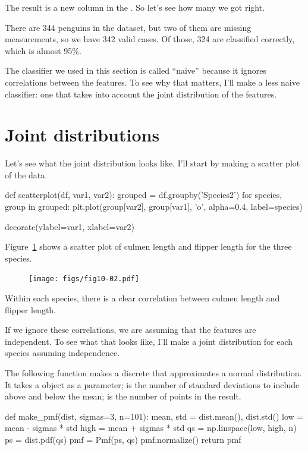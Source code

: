 \documentclass[12pt]{book}
\theoremstyle{exercise}
\begin{document}
The result is a new column in the .
So let's see how many we got right.

There are 344 penguins in the dataset, but two of them are missing
measurements, so we have 342 valid cases.
Of those, 324 are classified correctly, which is almost 95\%.

The classifier we used in this section is called ``naive'' because it
ignores correlations between the features. To see why that matters, I'll
make a less naive classifier: one that takes into account the joint
distribution of the features.

\section{Joint distributions}
\label{joint-distributions}

Let's see what the joint distribution looks like.
I'll start by making a scatter plot of the data.

\begin{code}
def scatterplot(df, var1, var2):
    grouped = df.groupby('Species2')
    for species, group in grouped:
        plt.plot(group[var2], group[var1], 'o',
                 alpha=0.4, label=species)
    
    decorate(ylabel=var1, xlabel=var2)
\end{code}

Figure~\ref{fig01-02} shows a scatter plot of culmen length and flipper length for the three
species.

\begin{figure}
\centerline{\texttt{[image: figs/fig10-02.pdf]}}
\caption{}
\label{fig01-02}
\end{figure}

Within each species, there is a clear correlation between culmen length
and flipper length.

If we ignore these correlations, we are assuming that the features are
independent. To see what that looks like, I'll make a joint distribution
for each species assuming independence.

The following function makes a discrete 
that approximates a normal distribution.
It takes a  object as a parameter;  is the number of standard deviations to include above and below the mean;  is the number of points in the result.

\begin{code}
def make_pmf(dist, sigmas=3, n=101):
    mean, std = dist.mean(), dist.std()
    low = mean - sigmas * std
    high = mean + sigmas * std
    qs = np.linspace(low, high, n)
    ps = dist.pdf(qs)
    pmf = Pmf(ps, qs)
    pmf.normalize()
    return pmf
\end{code}
\end{document}
